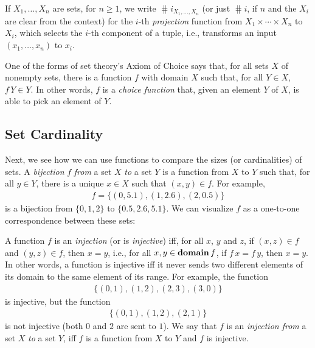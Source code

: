 If $X_1,\ldots,X_n$ are sets, for $n\geq 1$, we write %
%
%
%
$\hash{i}_{X_1,\ldots,X_n}$ (or just $\hash{i}$, if $n$ and the $X_i$
are clear from the context) for the $i$-th \emph{projection} function
from $X_1\times\cdots\times X_n$ to $X_i$, which selects the $i$-th component of
a tuple, i.e., transforms an input $(x_1,\ldots,x_n)$ to $x_i$.

One of the forms of set theory's Axiom of Choice
%
says that, for all sets $X$ of nonempty sets, there is a function $f$
with domain $X$ such that, for all $Y\in X$, $f\,Y\in Y$. In other
words, $f$ is a \emph{choice function}
%
that, given an element $Y$ of $X$, is able to pick an element of $Y$.

\subsection{Set Cardinality}

%
%
%
%
Next, we see how we can use functions to compare the sizes
(or cardinalities) of sets.
A \emph{bijection}
%
%
$f$ \emph{from} a set $X$ \emph{to} a set $Y$ is
a function from $X$ to $Y$ such that, for all $y\in Y$, there is a
unique $x\in X$ such that $(x,y)\in f$.
For example,
\begin{gather*}
f=\{(0,5.1),(1,2.6),(2,0.5)\}
\end{gather*}
is a bijection from $\{0,1,2\}$ to $\{0.5,2.6,5.1\}$.
We can visualize $f$ as a one-to-one correspondence
%
between these sets:
\begin{center}

\end{center}

A function $f$ is an \emph{injection} (or is \emph{injective})
%
%
%
%
iff, for all $x$, $y$ and $z$, if $(x,z)\in f$ and $(y,z)\in f$, then
$x=y$, i.e., for all $x,y\in\mathbf{domain}\,f$, if $f\,x=f\,y$, then $x=y$.
In other words, a function is injective iff it never sends two
different elements of its domain to the same element of its range.
For example, the function
\begin{gather*}
\{(0, 1), (1, 2), (2, 3), (3, 0)\}
\end{gather*}
is injective, but the function
\begin{gather*}
\{(0, 1), (1, 2), (2, 1)\}
\end{gather*}
is not injective (both $0$ and $2$ are sent to $1$).  We say that $f$
is an \emph{injection from} a set $X$ \emph{to} a set $Y$, iff $f$ is
%
%
a function from $X$ to $Y$ and $f$ is injective.

